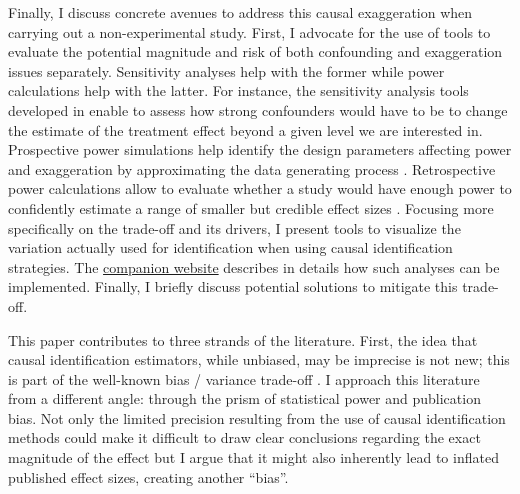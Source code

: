			Finally, I discuss concrete avenues to address this causal exaggeration when carrying out a non-experimental study. First, I advocate for the use of tools to evaluate the potential magnitude and risk of both confounding and exaggeration issues separately. Sensitivity analyses help with the former while power calculations help with the latter. %
			For instance, the sensitivity analysis tools developed in \cite{cinelli_making_2020} enable to assess how strong confounders would have to be to change the estimate of the treatment effect beyond a given level we are interested in.
			Prospective power simulations help identify the design parameters affecting power and exaggeration by approximating the data generating process \citep{gelman_regression_2020, black_simulated_2021}. Retrospective power calculations allow to evaluate whether a study would have enough power to confidently estimate a range of smaller but credible effect sizes \citep{gelman_beyond_2014, stommes_reliability_2021}.
			Focusing more specifically on the trade-off and its drivers, I present tools to visualize the variation actually used for identification when using causal identification strategies. The \href{https://vincentbagilet.github.io/causal_exaggeration/}{companion website} describes in details how such analyses can be implemented. Finally, I briefly discuss potential solutions to mitigate this trade-off.
						
			This paper contributes to three strands of the literature. First, the idea that causal identification estimators, while unbiased, may be imprecise is not new; this is part of the well-known bias / variance trade-off \citep{imbens_optimal_2012, deaton_understanding_2018, hernan_causal_2020, ravallion_should_2020}. I approach this literature from a different angle: through the prism of statistical power and publication bias. Not only the limited precision resulting from the use of causal identification methods could make it difficult to draw clear conclusions regarding the exact magnitude of the effect but I argue that it might also inherently lead to inflated published effect sizes, creating another ``bias''. 
			
